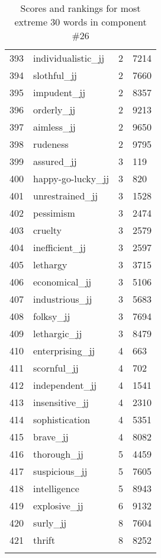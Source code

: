 \begin{longtable}[!htbp]{| rlr@{.}l |}
    393 & individualistic\_jj & 2 & 7214 \\
    394 & slothful\_jj & 2 & 7660 \\
    395 & impudent\_jj & 2 & 8357 \\
    396 & orderly\_jj & 2 & 9213 \\
    397 & aimless\_jj & 2 & 9650 \\
    398 & rudeness & 2 & 9795 \\
    399 & assured\_jj & 3 & 119 \\
    400 & happy-go-lucky\_jj & 3 & 820 \\
    401 & unrestrained\_jj & 3 & 1528 \\
    402 & pessimism & 3 & 2474 \\
    403 & cruelty & 3 & 2579 \\
    404 & inefficient\_jj & 3 & 2597 \\
    405 & lethargy & 3 & 3715 \\
    406 & economical\_jj & 3 & 5106 \\
    407 & industrious\_jj & 3 & 5683 \\
    408 & folksy\_jj & 3 & 7694 \\
    409 & lethargic\_jj & 3 & 8479 \\
    410 & enterprising\_jj & 4 & 663 \\
    411 & scornful\_jj & 4 & 702 \\
    412 & independent\_jj & 4 & 1541 \\
    413 & insensitive\_jj & 4 & 2310 \\
    414 & sophistication & 4 & 5351 \\
    415 & brave\_jj & 4 & 8082 \\
    416 & thorough\_jj & 5 & 4459 \\
    417 & suspicious\_jj & 5 & 7605 \\
    418 & intelligence & 5 & 8943 \\
    419 & explosive\_jj & 6 & 9132 \\
    420 & surly\_jj & 8 & 7604 \\
    421 & thrift & 8 & 8252 \\
    \hline
    \caption{Scores and rankings for most extreme 30 words in component \#26} \\
\end{longtable}
